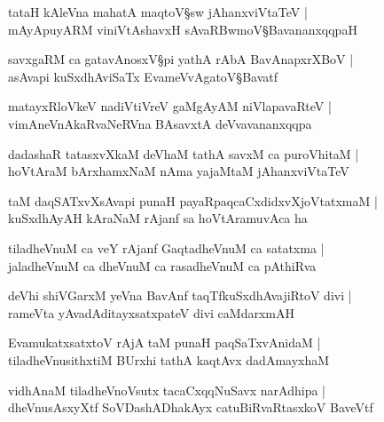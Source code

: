\begin{shloka}
tataH kAleVna mahatA maqtoV\S sw jAhanxviVtaTeV |\\
mAyApuyARM viniVtAshavxH sAvaRBwmoV\S BavananxqqpaH 
\end{shloka}

\begin{shloka}
savxgaRM ca gatavAnosxV\S pi yathA rAbA BavAnapxrXBoV |\\
asAvapi kuSxdhAviSaTx EvameVvAgatoV\S Bavatf
\end{shloka}

\begin{shloka}
matayxRloVkeV nadiVtiVreV gaMgAyAM niVlapavaRteV |\\
vimAneVnAkaRvaNeRVna BAsavxtA deVvavananxqqpa
\end{shloka}

\begin{shloka}
dadashaR tatasxvXkaM deVhaM tathA savxM ca puroVhitaM |\\
hoVtAraM bArxhamxNaM nAma yajaMtaM jAhanxviVtaTeV
\end{shloka}

\begin{shloka}
taM daqSATxvXsAvapi punaH payaRpaqcaCxdidxvXjoVtatxmaM |\\
kuSxdhAyAH kAraNaM rAjanf sa hoVtAramuvAca ha 
\end{shloka}

\begin{shloka}
tiladheVnuM ca veY rAjanf GaqtadheVnuM ca satatxma |\\
jaladheVnuM ca dheVnuM ca rasadheVnuM ca pAthiRva
\end{shloka}

\begin{shloka}
deVhi shiVGarxM yeVna BavAnf taqTfkuSxdhAvajiRtoV divi |\\
rameVta yAvadAditayxsatxpateV divi caMdarxmAH 
\end{shloka}

\begin{shloka}
EvamukatxsatxtoV rAjA taM punaH paqSaTxvAnidaM |\\
tiladheVnusithxtiM BUrxhi tathA kaqtAvx dadAmayxhaM 
\end{shloka}

\begin{shloka}
vidhAnaM tiladheVnoVsutx tacaCxqqNuSavx narAdhipa |\\
dheVnusAsxyXtf SoVDashADhakAyx catuBiRvaRtasxkoV BaveVtf
\end{shloka}

